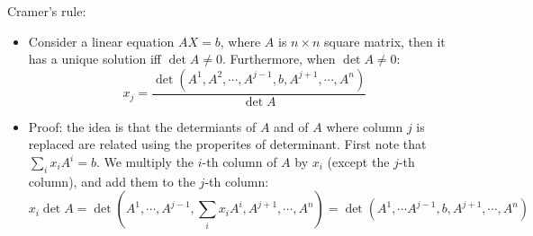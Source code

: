 \documentclass{report}
\begin{document}
Cramer's rule: 
\begin{itemize}
\item Consider a linear equation $AX = b$, where $A$ is $n \times n$ square matrix, then it has a unique solution iff $\det A \neq 0$. Furthermore, when $\det A \neq 0$: 
	\begin{equation}
	x_j = \frac{\det(A^1,A^2, \cdots, A^{j-1},b, A^{j+1}, \cdots, A^n)}{\det A}	
	\end{equation}
	
\item Proof: the idea is that the determiants of $A$ and of $A$ where column $j$ is replaced are related using the properites of determinant. First note that $\sum_i x_i A^i = b$. We multiply the $i$-th column of $A$ by $x_i$ (except the $j$-th column), and add them to the $j$-th column: 
\begin{equation}
x_i \det A = \det (A^1, \cdots, A^{j-1}, \sum_i x_i A^i, A^{j+1}, \cdots, A^n) = \det(A^1, \cdots A^{j-1}, b, A^{j+1}, \cdots, A^n) 	
\end{equation}
\end{itemize}
\end{document}
